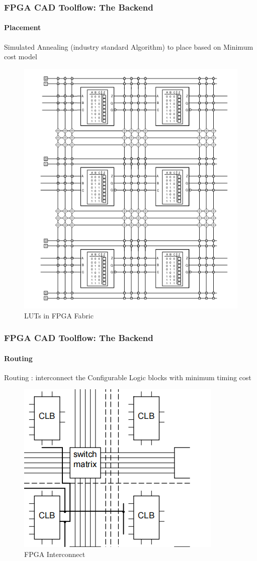 \documentclass{beamer}
\begin{document}
\begin{frame}[fragile]
  \frametitle{FPGA CAD Toolflow: The Backend}
  \framesubtitle{Placement}
  Simulated Annealing (industry standard Algorithm) to place based on Minimum cost model 
  \begin{figure}
    \centering
    \includegraphics[width=0.35\linewidth]{images/Lut_bare.png}
    \caption{LUTs in FPGA Fabric\cite{brown92}}
    \label{exa-fabric}
  \end{figure}

\end{frame}

\begin{frame}[fragile]
  \frametitle{FPGA CAD Toolflow: The Backend}
  \framesubtitle{Routing}
  Routing : interconnect the Configurable Logic  blocks with minimum timing cost 
  \begin{figure}
    \centering
    \includegraphics[width=0.5\linewidth]{images/switch_matrix.png}
    \caption{FPGA Interconnect }
    \label{exa_interconnect}
  \end{figure}
\end{frame}
\end{document}
